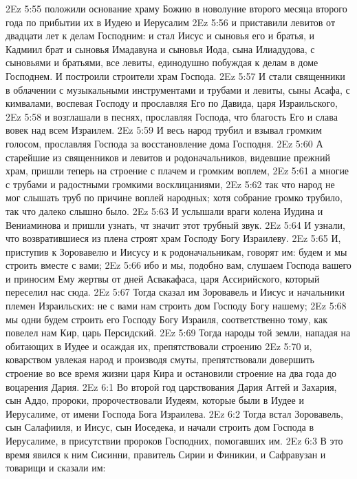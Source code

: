 \vs 2Ez 5:55 положили основание храму Божию в новолуние второго месяца второго года по прибытии их в Иудею и Иерусалим
\vs 2Ez 5:56 и приставили левитов от двадцати лет к делам Господним: и стал Иисус и сыновья его и братья, и Кадмиил брат и сыновья Имадавуна и сыновья Иода, сына Илиадудова, с сыновьями и братьями, все левиты, единодушно побуждая к делам в доме Господнем. И построили строители храм Господа.
\vs 2Ez 5:57 И стали священники в облачении с музыкальными инструментами и трубами и левиты, сыны Асафа, с кимвалами, воспевая Господу и прославляя Его по  Давида, царя Израильского,
\vs 2Ez 5:58 и возглашали в песнях, прославляя Господа, что благость Его и слава вовек над всем Израилем.
\vs 2Ez 5:59 И весь народ трубил и взывал громким голосом, прославляя Господа за восстановление дома Господня.
\vs 2Ez 5:60 А старейшие из священников и левитов и родоначальников, видевшие прежний храм, пришли теперь на строение с плачем и громким воплем,
\vs 2Ez 5:61 а многие с трубами и радостными громкими восклицаниями,
\vs 2Ez 5:62 так что народ не мог слышать труб по причине воплей народных; хотя собрание громко трубило, так что далеко слышно было.
\rsbpar\vs 2Ez 5:63 И услышали враги колена Иудина и Вениаминова и пришли узнать, чт значит этот трубный звук.
\vs 2Ez 5:64 И узнали, что возвратившиеся из плена строят храм Господу Богу Израилеву.
\vs 2Ez 5:65 И, приступив к Зоровавелю и Иисусу и к родоначальникам, говорят им: будем и мы строить вместе с вами;
\vs 2Ez 5:66 ибо и мы, подобно вам, слушаем Господа вашего и приносим Ему жертвы от дней Асвакафаса, царя Ассирийского, который переселил нас сюда.
\vs 2Ez 5:67 Тогда сказал им Зоровавель и Иисус и начальники племен Израильских: не с вами нам строить дом Господу Богу нашему;
\vs 2Ez 5:68 мы одни будем строить его Господу Богу Израиля, соответственно тому, как повелел нам Кир, царь Персидский.
\vs 2Ez 5:69 Тогда народы той земли, нападая на обитающих в Иудее и осаждая их, препятствовали строению
\vs 2Ez 5:70 и, коварством увлекая народ и производя смуты, препятствовали довершить строение во все время жизни царя Кира и остановили строение на два года до воцарения Дария.
\vs 2Ez 6:1 Во второй год царствования Дария Аггей и Захария, сын Аддо, пророки, пророчествовали Иудеям, которые были в Иудее и Иерусалиме, от имени Господа Бога Израилева.
\vs 2Ez 6:2 Тогда встал Зоровавель, сын Салафииля, и Иисус, сын Иоседека, и начали строить дом Господа в Иерусалиме, в присутствии пророков Господних, помогавших им.
\rsbpar\vs 2Ez 6:3 В это время явился к ним Сисинни, правитель Сирии и Финикии, и Сафравузан и товарищи  и сказали им:
